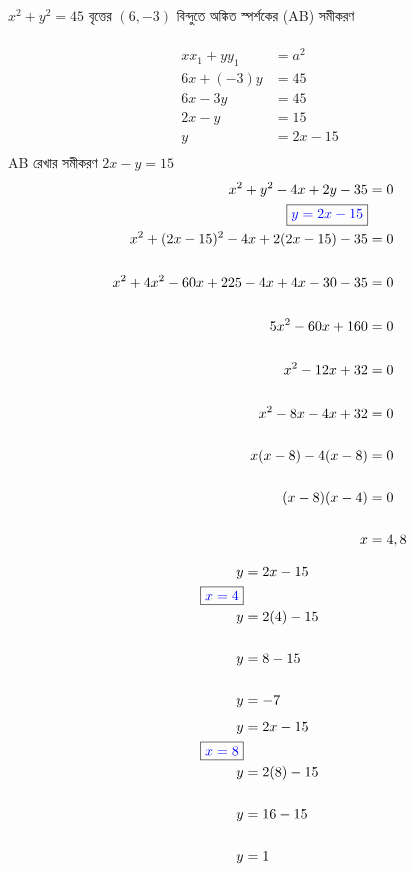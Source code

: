 \documentclass{article}
\begin{document}
	$x^2+y^2=45$ বৃত্তের  $(6,-3)$ বিন্দুতে অঙ্কিত স্পর্শকের (AB) সমীকরণ\\ 
	\\ 
	\begin{align*}
		xx_1+yy_1&=a^2\\
		6x+(-3)y&=45\\
		6x-3y&=45\\
		2x-y&=15\\
		y&=2x-15\\
	\end{align*}
AB রেখার সমীকরণ  $2x-y=15$\\ 
	\begin{align*}
		x^2+y^2-4x+2y-35&=0\\
		\boxed{\textcolor{blue}{y=2x-15}}&\\
		x^2+(2x-15)^2-4x+2(2x-15)-35&=0\\
		\\
		x^2+4x^2-60x+225-4x+4x-30-35&=0\\
		\\
		5x^2-60x+160&=0\\
		\\
		x^2-12x+32&=0\\
		\\
		x^2-8x-4x+32&=0\\
		\\
		x(x-8)-4(x-8)&=0\\
		\\
		(x-8)(x-4)&=0\\
		\\
		x&=4,8\\
	\end{align*}
\begin{multicols}{2}
	\begin{align*}
	y&=2x-15\\
	\boxed{\textcolor{blue}{x=4}}&\\
	y&=2(4)-15\\
	\\
	y&=8-15\\
	\\
	y&=-7\\
\end{align*}
\begin{align*}
	y&=2x-15\\
	\boxed{\textcolor{blue}{x=8}}&\\
	y&=2(8)-15\\
	\\
	y&=16-15\\
	\\
	y&=1\\
\end{align*}
\end{multicols}
\end{document}
